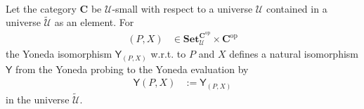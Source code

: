 \\
\begin{lem}
\label{lem:yonedaadd}
Let the category $\mathbf{C}$ be $\mathcal{U}$-small with respect to a universe $\mathcal{U}$ contained in a universe $\tilde{\mathcal{U}}$ as an element. For
\begin{align*}
  (P,X)
  &\in
  \mathbf{Set}_{\mathcal{U}}^{\mathbf{C}^{\mathrm{op}}}
  \times
  \mathbf{C}^{\mathrm{op}}
\end{align*}
the Yoneda isomorphism $\mathsf{Y}_{(P,X)}$ w.r.t. to $P$ and $X$ defines a natural isomorphism $\mathsf{Y}$ from the Yoneda probing to the Yoneda evaluation by
\begin{align*}
  \mathsf{Y}(P,X)
  &:=
  \mathsf{Y}_{(P,X)}
\end{align*}
in the universe $\tilde{\mathcal{U}}$.
\end{lem}
